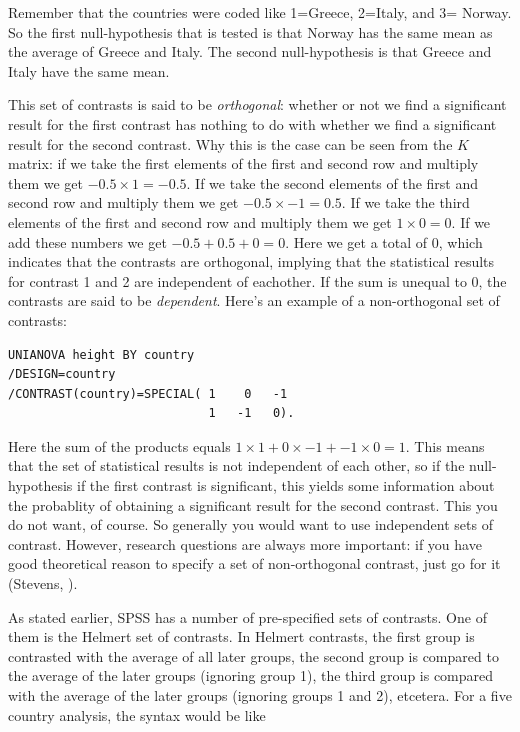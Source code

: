 \documentclass[]{book}\usepackage[]{graphicx}\usepackage[]{color}
\begin{document}
Remember that the countries were coded like 1=Greece, 2=Italy, and 3= Norway. So the first null-hypothesis that is tested is that Norway has the same mean as the average of Greece and Italy. The second null-hypothesis is that Greece and Italy have the same mean.

This set of contrasts is said to be \textit{orthogonal}: whether or not we find a significant result for the first contrast has nothing to do with whether we find a significant result for the second contrast. Why this is the case can be seen from the $K$ matrix: if we take the first elements of the first and second row and multiply them we get $-0.5 \times 1 = -0.5$. If we take the second elements of the first and second row and multiply them we get $-0.5 \times -1 = 0.5$. If we take the third elements of the first and second row and multiply them we get $1 \times 0 = 0$. If we add these numbers we get $-0.5 + 0.5 +0= 0 $. Here we get a total of 0, which indicates that the contrasts are orthogonal, implying that the statistical results for contrast 1 and 2 are independent of eachother. If the sum is unequal to 0, the contrasts are said to be \textit{dependent}. 
Here's an example of a non-orthogonal set of contrasts:

\begin{verbatim}
UNIANOVA height BY country
/DESIGN=country
/CONTRAST(country)=SPECIAL( 1    0   -1
                            1   -1   0).
\end{verbatim}

Here the sum of the products equals $1\times 1 +0\times -1 + -1 \times 0 =1$. This means that the set of statistical results is not independent of each other, so if the null-hypothesis if the first contrast is significant, this yields some information about the probablity of obtaining a significant result for the second contrast. This you do not want, of course. So generally you would want to use independent sets of contrast. However, research questions are always more important: if you have good theoretical reason to specify a set of non-orthogonal contrast, just go for it (Stevens, ).

As stated earlier, SPSS has a number of pre-specified sets of contrasts. One of them is the Helmert set of contrasts. In Helmert contrasts, the first group is contrasted with the average of all later groups, the second group is compared to the average of the later groups (ignoring group 1), the third group is compared with the average of the later groups (ignoring groups 1 and 2), etcetera. For a five country analysis, the syntax would be like
\end{document}
